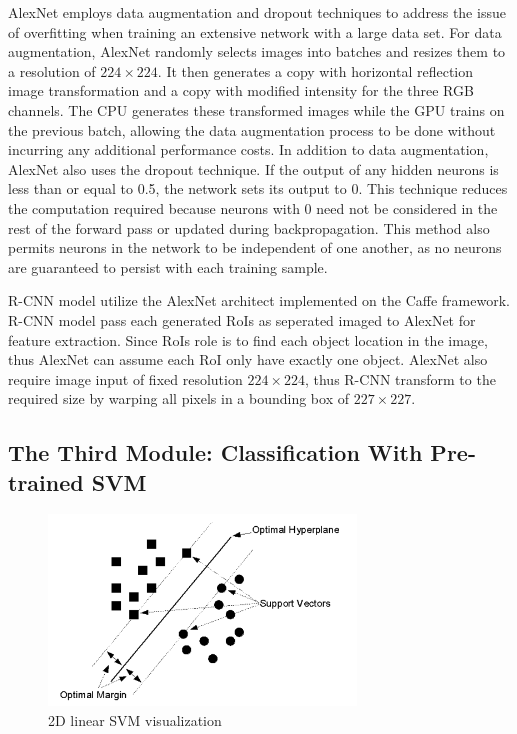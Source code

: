 AlexNet employs data augmentation and dropout techniques to address the issue of overfitting when training an extensive network with a large data set. For data augmentation, AlexNet randomly selects images into batches and resizes them to a resolution of $224 \times 224$. It then generates a copy with horizontal reflection image transformation and a copy with modified intensity for the three RGB channels. The CPU generates these transformed images while the GPU trains on the previous batch, allowing the data augmentation process to be done without incurring any additional performance costs. In addition to data augmentation, AlexNet also uses the dropout technique. If the output of any hidden neurons is less than or equal to 0.5, the network sets its output to 0. This technique reduces the computation required because neurons with 0 need not be considered in the rest of the forward pass or updated during backpropagation. This method also permits neurons in the network to be independent of one another, as no neurons are guaranteed to persist with each training sample.

R-CNN model utilize the AlexNet architect implemented on the Caffe framework. R-CNN model pass each generated RoIs as seperated imaged to AlexNet for feature extraction. Since RoIs role is to find each object location in the image, thus AlexNet can assume each RoI only have exactly one object. AlexNet also require image input of fixed resolution $224 \times 224$, thus R-CNN transform to the required size by warping all pixels in a bounding box of $227 \times 227$.

\subsection{The Third Module: Classification With Pre-trained SVM}

\begin{figure}[!ht]
    \centering
    \includegraphics[height=2in]{figures/2d_svm.png}
    \caption{2D linear SVM visualization \cite{2d_svm_Tzotsos}} \label{fig:2d_svm_viz}
\end{figure}

